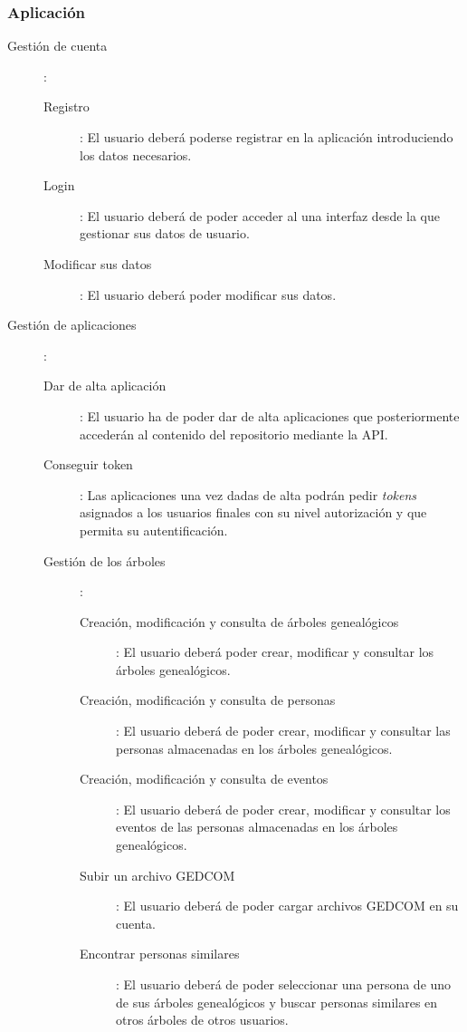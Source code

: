\subsubsection{Aplicación}
\begin{description}
\item[Gestión de cuenta]:
	\begin{description}
	\item[Registro]:
	El usuario deberá poderse registrar en la aplicación introduciendo los datos necesarios.
	\item[Login]:
	El usuario deberá de poder acceder al una interfaz desde la que gestionar sus datos de usuario.
	\item[Modificar sus datos]:
	El usuario deberá poder modificar sus datos.
	\end{description}		
\end{description}
\begin{description}
\item[Gestión de aplicaciones]:
	\begin{description}
	\item[Dar de alta aplicación]:
	El usuario ha de poder dar de alta aplicaciones que posteriormente accederán al contenido del repositorio mediante la API.
	\item[Conseguir token]:
	Las aplicaciones una vez dadas de alta podrán pedir \textit{tokens} asignados a los usuarios finales con su nivel autorización y que permita su autentificación.
	\end{description}
	
\begin{description}
\item[Gestión de los árboles]:
	\begin{description}
	\item[Creación, modificación y consulta de árboles genealógicos]:
	El usuario deberá poder crear, modificar y consultar los árboles genealógicos.
	\item[Creación, modificación y consulta de personas]:
	El usuario deberá de poder crear, modificar y consultar las personas almacenadas en los árboles genealógicos.
	\item[Creación, modificación y consulta de eventos]:
	El usuario deberá de poder crear, modificar y consultar los eventos de las personas almacenadas en los árboles genealógicos.
	\item[Subir un archivo GEDCOM]:
	El usuario deberá de poder cargar archivos GEDCOM en su cuenta.
	\item[Encontrar personas similares]:
	El usuario deberá de poder seleccionar una persona de uno de sus árboles genealógicos y buscar personas similares en otros árboles de otros usuarios.
	\end{description}
\end{description}
\end{description}

